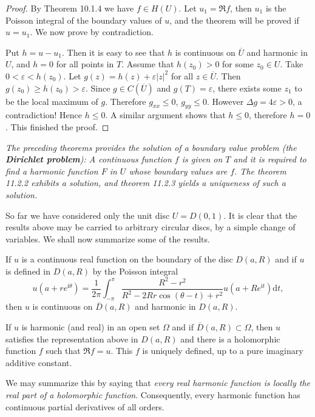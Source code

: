 \begin{proof}
By Theorem 10.1.4 we have $f\in H(U)$. Let $u_1=\Re f$, then $u_1$ is the Poisson integral of the boundary values of $u$, and the theorem will be proved if $u=u_1$. We now prove by contradiction.\par
Put $h=u-u_1$. Then it is easy to see that $h$ is continuous on $\overline{U}$ and harmonic in $U$, and $h=0$ for all points in $T$. Assume that $h(z_0)>0$ for some $z_0\in U$. Take $0<\varepsilon<h(z_0)$. Let $g(z)=h(z)+\varepsilon|z|^2$ for all $z\in\overline{U}$. Then $g(z_0)\ge h(z_0)>\varepsilon$. Since $g\in C(\overline{U})$ and $g(T)=\varepsilon$, there exists some $z_1$ to be the local maximum of $g$. Therefore $g_{xx}\le 0$, $g_{yy}\le 0$. However $\Delta g=4\varepsilon>0$, a contradiction! Hence $h\le 0$. A similar argument shows that $h\le 0$, therefore $h=0$. This finished the proof. 
\end{proof}
\begin{note}\em
The preceding theorems provides the solution of a boundary value problem (the \textbf{Dirichlet problem}): A continuous function $f$ is given on $T$ and it is required to find a harmonic function $F$ in $U$ whose boundary values are $f$. The theorem 11.2.2 exhibits a solution, and theorem 11.2.3 yields a uniqueness of such a solution.
\end{note}
So far we have considered only the unit disc $U=D(0,1)$. It is clear that the results above may be carried to arbitrary circular discs, by a simple change of variables. We shall now summarize some of the results.\par
If $u$ is a continuous real function on the boundary of the disc $D(a,R)$ and if $u$ is defined in $D(a,R)$ by the Poisson integral 
$$
u\left( a+re^{\mathrm{i}\theta} \right) =\frac{1}{2\pi}\int_{-\pi}^{\pi}{\frac{R^2-r^2}{R^2-2Rr\cos \left( \theta -t \right) +r^2}u\left( a+Re^{\mathrm{i}t} \right) \mathrm{d}t},
$$
then $u$ is continuous on $\overline{D}(a,R)$ and harmonic in $D(a,R)$.\par
If $u$ is harmonic (and real) in an open set $\Omega$ and if $\overline{D}(a,R)\subset\Omega$, then $u$ satisfies the representation above in $D(a,R)$ and there is a holomorphic function $f$ such that $\Re f=u$. This $f$ is uniquely defined, up to a pure imaginary additive constant.\par
We may summarize this by saying that \textit{every real harmonic function is locally the real part of a holomorphic function}. Consequently, every harmonic function has continuous partial derivatives of all orders.\par
